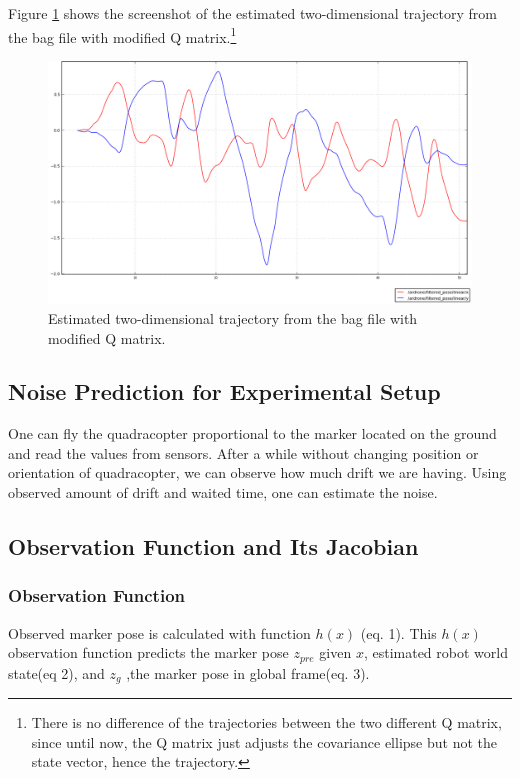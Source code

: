 \documentclass[14pt,a4paper]{article}
\begin{document}
		Figure \ref{graph:filtered_pose_modifiedQ} shows the screenshot of the estimated two-dimensional trajectory from the bag file with modified Q matrix.\footnote{There is no difference of the trajectories between the two different Q matrix, since until now, the Q matrix just adjusts the covariance ellipse but not the state vector, hence the trajectory.}
	
	\begin{figure}[htbp]
	\centering
	\includegraphics[scale=0.4]{filtered_pose_modifiedQ.png}
  	\caption{Estimated two-dimensional trajectory from the bag file with modified Q matrix.}
    \label{graph:filtered_pose_modifiedQ}
	\end{figure}
	
	\subsection{Noise Prediction for Experimental Setup}	
	
	One can fly the quadracopter proportional to the marker located on the ground and read the values from sensors. After a while without changing position or orientation of quadracopter, we can observe how much drift we are having. Using observed amount of drift and waited time, one can estimate the noise.
	
	\subsection{Observation Function and Its Jacobian}
	
		\subsubsection{Observation Function}
		
	 	Observed marker pose is calculated with function $h(x)$ (eq. 1). This $h(x)$ observation function predicts the marker pose $z_{pre}$ given $x$, estimated robot world state(eq 2), and $z_{g}$ ,the marker pose in global frame(eq. 3).
		 
\end{document}
